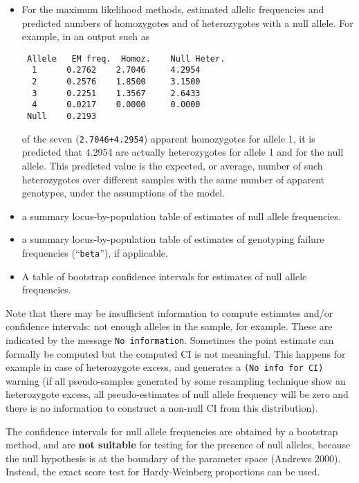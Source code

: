 \documentclass[12pt,]{book}
\begin{document}
\begin{itemize}
\item
  For the maximum likelihood methods, estimated allelic frequencies and
  predicted numbers of homozygotes and of heterozygotes with a null
  allele. For example, in an output such as

\begin{verbatim}
 Allele   EM freq.  Homoz.    Null Heter.
  1      0.2762    2.7046     4.2954
  2      0.2576    1.8500     3.1500
  3      0.2251    1.3567     2.6433
  4      0.0217    0.0000     0.0000
 Null    0.2193
\end{verbatim}

  of the seven (\texttt{2.7046+4.2954}) apparent homozygotes for allele
  1, it is predicted that 4.2954 are actually heterozygotes for allele 1
  and for the null allele. This predicted value is the expected, or
  average, number of such heterozygotes over different samples with the
  same number of apparent genotypes, under the assumptions of the model.
\item
  a summary locus-by-population table of estimates of null allele
  frequencies.
\item
  a summary locus-by-population table of estimates of genotyping failure
  frequencies (``\texttt{beta}''), if applicable.
\item
  A table of bootstrap confidence intervals for estimates of null allele
  frequencies.
\end{itemize}

Note that there may be insufficient information to compute estimates
and/or confidence intervals: not enough alleles in the sample, for
example. These are indicated by the message \texttt{No\ information}.
Sometimes the point estimate can formally be computed but the computed
CI is not meaningful. This happens for example in case of heterozygote
excess, and generates a \texttt{(No\ info\ for\ CI)} warning (if all
pseudo-samples generated by some resampling technique show an
heterozygote excess, all pseudo-estimates of null allele frequency will
be zero and there is no information to construct a non-null CI from this
distribution).

The confidence intervals for null allele frequencies are obtained by a
bootstrap method, and are \textbf{not suitable} for testing for the
presence of null alleles, because the null hypothesis is at the boundary
of the parameter space (Andrews 2000). Instead, the exact score test for
Hardy-Weinberg proportions can be used.
\end{document}
